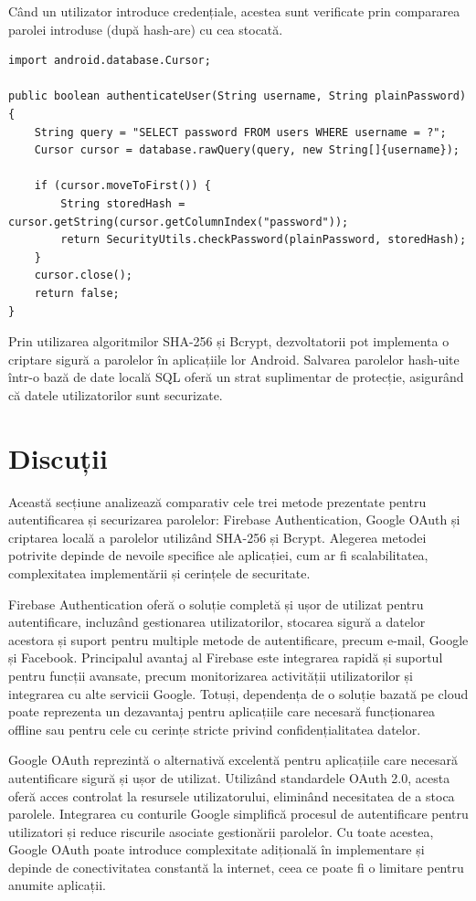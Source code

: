 \documentclass[runningheads]{llncs}
\begin{document}
Când un utilizator introduce credențiale, acestea sunt verificate prin compararea parolei introduse (după hash-are) cu cea stocată.

\begin{lstlisting}
import android.database.Cursor;

public boolean authenticateUser(String username, String plainPassword) {
    String query = "SELECT password FROM users WHERE username = ?";
    Cursor cursor = database.rawQuery(query, new String[]{username});

    if (cursor.moveToFirst()) {
        String storedHash = cursor.getString(cursor.getColumnIndex("password"));
        return SecurityUtils.checkPassword(plainPassword, storedHash);
    }
    cursor.close();
    return false;
}
\end{lstlisting}

Prin utilizarea algoritmilor SHA-256 și Bcrypt, dezvoltatorii pot implementa o criptare sigură a parolelor în aplicațiile lor Android. Salvarea parolelor hash-uite într-o bază de date locală SQL oferă un strat suplimentar de protecție, asigurând că datele utilizatorilor sunt securizate.


\section{Discuții}
Această secțiune analizează comparativ cele trei metode prezentate pentru autentificarea și securizarea parolelor: Firebase Authentication, Google OAuth și criptarea locală a parolelor utilizând SHA-256 și Bcrypt. Alegerea metodei potrivite depinde de nevoile specifice ale aplicației, cum ar fi scalabilitatea, complexitatea implementării și cerințele de securitate.

Firebase Authentication oferă o soluție completă și ușor de utilizat pentru autentificare, incluzând gestionarea utilizatorilor, stocarea sigură a datelor acestora și suport pentru multiple metode de autentificare, precum e-mail, Google și Facebook. Principalul avantaj al Firebase este integrarea rapidă și suportul pentru funcții avansate, precum monitorizarea activității utilizatorilor și integrarea cu alte servicii Google. Totuși, dependența de o soluție bazată pe cloud poate reprezenta un dezavantaj pentru aplicațiile care necesară funcționarea offline sau pentru cele cu cerințe stricte privind confidențialitatea datelor.

Google OAuth reprezintă o alternativă excelentă pentru aplicațiile care necesară autentificare sigură și ușor de utilizat. Utilizând standardele OAuth 2.0, acesta oferă acces controlat la resursele utilizatorului, eliminând necesitatea de a stoca parolele. Integrarea cu conturile Google simplifică procesul de autentificare pentru utilizatori și reduce riscurile asociate gestionării parolelor. Cu toate acestea, Google OAuth poate introduce complexitate adițională în implementare și depinde de conectivitatea constantă la internet, ceea ce poate fi o limitare pentru anumite aplicații.
\end{document}
